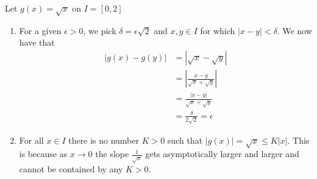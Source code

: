 \documentclass[boxes, qed]{homework}
\begin{document}
\begin{problem}Let $g(x)=\sqrt{x}$ on $I = [0, 2]$
\end{problem}
\begin{solution}
  \begin{enumerate}
    \item For a given $\epsilon>0$, we pick $\delta=\epsilon\sqrt{2}$ 
    and $x,y \in I$ for which $|x-y|<\delta$. We now have that
    \begin{align*}
      |g(x)-g(y)| 
      &= |\sqrt{x}-\sqrt{y}|\\
      &= |\frac{x-y}{\sqrt{x}+\sqrt{y}}|\\
      &= \frac{|x-y|}{\sqrt{x}+\sqrt{y}}\\
      &= \frac{\delta}{2\sqrt{2}} = \epsilon
    \end{align*}

    \item For all $x \in I$ there is no number $K > 0$ such that $|g(x)|=\sqrt{x} \le K|x|$.
    This is because as $x\to{0}$ the slope $\frac{1}{\sqrt{x}}$
    gets asymptotically larger and larger and cannot be contained by any $K>0$.
  \end{enumerate}
\end{solution}
\end{document}
